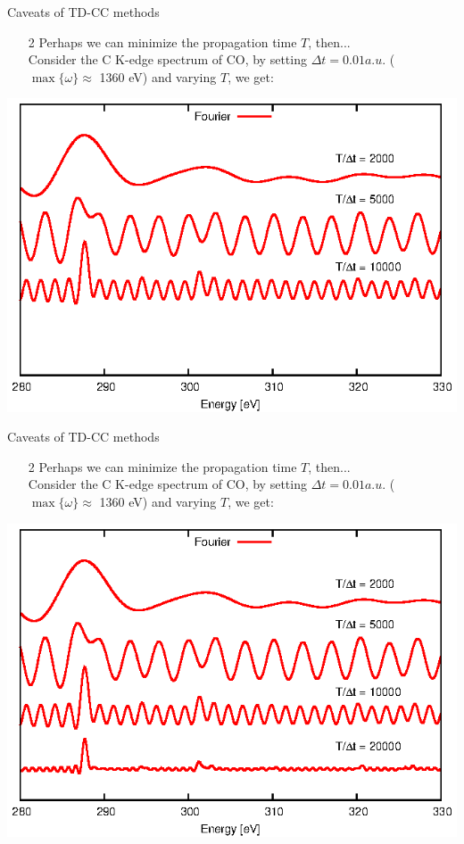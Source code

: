 \documentclass{beamer}
\begin{document}
\begin{frame}{Caveats of TD-CC methods}
\begin{enumerate}
\item[2]{Perhaps we can minimize the propagation time $T$, then...}\\
\vspace{5pt}
Consider the C K-edge spectrum of CO, by setting $\Delta t = 0.01 a.u.$ ($\max\{\omega\} \approx$ 1360 eV) and varying $T$, we get: 
\end{enumerate}
\begin{center}
 \includegraphics[scale=1.0]{figures/conv_anim_3.eps}
\end{center}
\end{frame}

\begin{frame}{Caveats of TD-CC methods}
\begin{enumerate}
\item[2]{Perhaps we can minimize the propagation time $T$, then...}\\
\vspace{5pt}
Consider the C K-edge spectrum of CO, by setting $\Delta t = 0.01 a.u.$ ($\max\{\omega\} \approx$ 1360 eV) and varying $T$, we get: 
\end{enumerate}
\begin{center}
 \includegraphics[scale=1.0]{figures/conv_anim_4.eps}
\end{center}
\end{frame}
\end{document}
